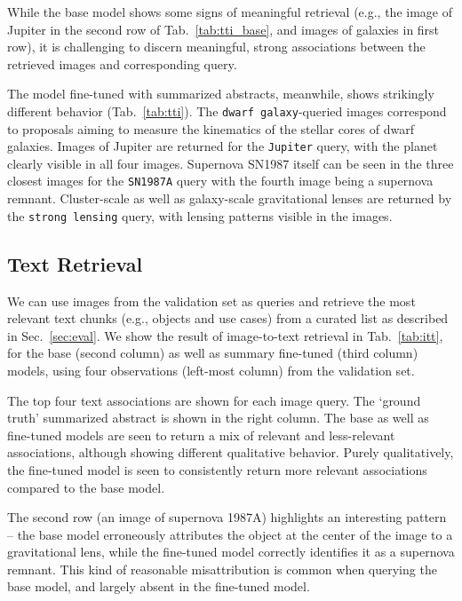 \documentclass[10pt]{article} %
\begin{document}
While the base model shows some signs of meaningful retrieval (e.g., the image of Jupiter in the second row of Tab.~\ref{tab:tti_base}, and images of galaxies in first row), it is challenging to discern meaningful, strong associations between the retrieved images and corresponding query.

The model fine-tuned with summarized abstracts, meanwhile, shows strikingly different behavior (Tab.~\ref{tab:tti}).
%
The \texttt{dwarf galaxy}-queried images correspond to proposals aiming to measure the kinematics of the stellar cores of dwarf galaxies.
%
Images of Jupiter are returned for the \texttt{Jupiter} query, with the planet clearly visible in all four images.
%
Supernova SN1987 itself can be seen in the three closest images for the \texttt{SN1987A} query with the fourth image being a supernova remnant.
%
Cluster-scale as well as galaxy-scale gravitational lenses are returned by the \texttt{strong lensing} query, with lensing patterns visible in the images.

\subsection{Text Retrieval}

We can use images from the validation set as queries and retrieve the most relevant text chunks (e.g., objects and use cases) from a curated list as described in Sec.~\ref{sec:eval}.
%
We show the result of image-to-text retrieval in Tab.~\ref{tab:itt}, for the base (second column) as well as summary fine-tuned (third column) models, using four observations (left-most column) from the validation set.
% 

The top four text associations are shown for each image query.
%
The `ground truth' summarized abstract is shown in the right column.
% 
The base as well as fine-tuned models are seen to return a mix of relevant and less-relevant associations, although showing different qualitative behavior. Purely qualitatively, the fine-tuned model is seen to consistently return more relevant associations compared to the base model.
%

The second row (an image of supernova 1987A) highlights an interesting pattern -- the base model erroneously attributes the object at the center of the image to a gravitational lens, while the fine-tuned model correctly identifies it as a supernova remnant. This kind of reasonable misattribution is common when querying the base model, and largely absent in the fine-tuned model.
\end{document}
